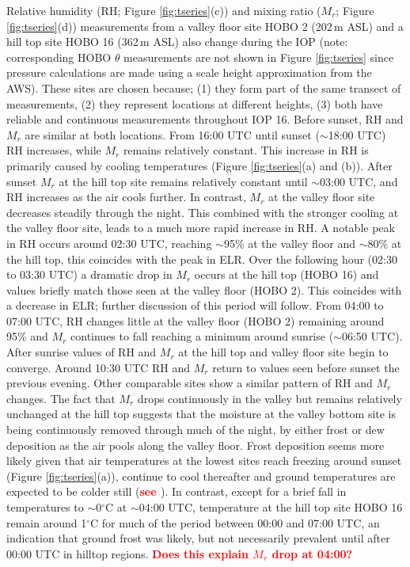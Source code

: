 \documentclass[times]{qjrms4}
\begin{document}
Relative humidity (RH; Figure \ref{fig:tseries}(c)) and mixing ratio ($M_r$; Figure \ref{fig:tseries}(d)) measurements from a valley floor site HOBO 2 (202$\,\mbox{m}$ ASL) and a hill top site HOBO 16 (362$\,\mbox{m}$ ASL) also change during the IOP (note: corresponding HOBO $\theta$ measurements are not shown in Figure \ref{fig:tseries} since pressure calculations are made using a scale height approximation from the AWS). These sites are chosen because; (1) they form part of the same transect of measurements, (2) they represent locations at different heights, (3) both have reliable and continuous measurements throughout IOP 16. Before sunset, RH and $M_r$ are similar at both locations. From 16:00 UTC until sunset ($\sim$18:00 UTC) RH increases, while $M_r$ remains relatively constant. This increase in RH is primarily caused by cooling temperatures (Figure \ref{fig:tseries}(a) and (b)). After sunset $M_r$ at the hill top site remains relatively constant until $\sim$03:00 UTC, and RH increases as the air cools further. In contrast, $M_r$ at the valley floor site decreases steadily through the night. This combined with the stronger cooling at the valley floor site, leads to a much more rapid increase in RH. A notable peak in RH occurs around 02:30 UTC, reaching $\sim$95\% at the valley floor and $\sim$80\% at the hill top, this coincides with the peak in ELR. Over the following hour (02:30 to 03:30 UTC) a dramatic drop in $M_r$ occurs at the hill top (HOBO 16) and values briefly match those seen at the valley floor (HOBO 2). This coincides with a decrease in ELR; further discussion of this period will follow. From 04:00 to 07:00 UTC, RH changes little at the valley floor (HOBO 2) remaining around 95\% and $M_r$ continues to fall reaching a minimum around sunrise ($\sim$06:50 UTC). After sunrise values of RH and $M_r$ at the hill top and valley floor site begin to converge. Around 10:30 UTC RH and $M_r$ return to values seen before sunset the previous evening. Other comparable sites show a similar pattern of RH and $M_r$ changes. The fact that $M_r$ drops continuously in the valley but remains relatively unchanged at the hill top suggests that the moisture at the valley bottom site is being continuously removed through much of the night, by either frost or dew deposition as the air pools along the valley floor. Frost deposition seems more likely given that air temperatures at the lowest sites reach freezing around sunset (Figure \ref{fig:tseries}(a)), continue to cool thereafter and ground temperatures are expected to be colder still (\textcolor{red}{\bf see \citet{Vosper2013narrow}}). In contrast, except for a brief fall in temperatures to $\sim$0$^{\circ}$C at $\sim$04:00 UTC, temperature at the hill top site HOBO 16 remain around 1$^\circ$C for much of the period between 00:00 and 07:00 UTC, an indication that ground frost was likely, but not necessarily prevalent until after 00:00 UTC in hilltop regions. \textcolor{red}{\bf Does this explain $M_r$ drop at 04:00?} 
\end{document}
